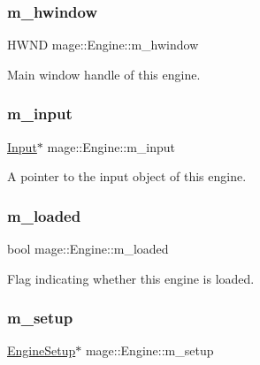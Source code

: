 \subsubsection{\texorpdfstring{m\+\_\+hwindow}{m\_hwindow}}
{\footnotesize\ttfamily H\+W\+ND mage\+::\+Engine\+::m\+\_\+hwindow\hspace{0.3cm}{\ttfamily [private]}}

Main window handle of this engine. \hypertarget{classmage_1_1_engine_a432ac639c593fd0fb8cede2463fe10c2}{}\label{classmage_1_1_engine_a432ac639c593fd0fb8cede2463fe10c2} 
\subsubsection{\texorpdfstring{m\+\_\+input}{m\_input}}
{\footnotesize\ttfamily \hyperlink{classmage_1_1_input}{Input}$\ast$ mage\+::\+Engine\+::m\+\_\+input\hspace{0.3cm}{\ttfamily [private]}}

A pointer to the input object of this engine. \hypertarget{classmage_1_1_engine_a2f8783761b9629dd507d0a6bc456125b}{}\label{classmage_1_1_engine_a2f8783761b9629dd507d0a6bc456125b} 
\subsubsection{\texorpdfstring{m\+\_\+loaded}{m\_loaded}}
{\footnotesize\ttfamily bool mage\+::\+Engine\+::m\+\_\+loaded\hspace{0.3cm}{\ttfamily [private]}}

Flag indicating whether this engine is loaded. \hypertarget{classmage_1_1_engine_a825715684015ac2a43cfc5b6bf3b083f}{}\label{classmage_1_1_engine_a825715684015ac2a43cfc5b6bf3b083f} 
\subsubsection{\texorpdfstring{m\+\_\+setup}{m\_setup}}
{\footnotesize\ttfamily \hyperlink{structmage_1_1_engine_setup}{Engine\+Setup}$\ast$ mage\+::\+Engine\+::m\+\_\+setup\hspace{0.3cm}{\ttfamily [private]}}

